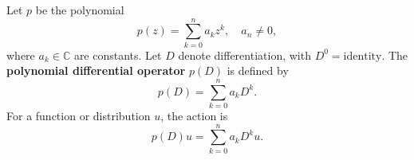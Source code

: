 Let $p$ be the polynomial
$$p(z) = \sum_{k=0}^{n} a_k z^k, \quad a_n \neq 0,$$
where $a_k \in \mathbb{C}$ are constants. Let $D$ denote differentiation, with $D^0 = \text{identity}$. The \textbf{polynomial differential operator} $p(D)$ is defined by
$$p(D) = \sum_{k=0}^{n} a_k D^k.$$
For a function or distribution $u$, the action is
$$p(D)u = \sum_{k=0}^{n} a_k D^k u.$$
